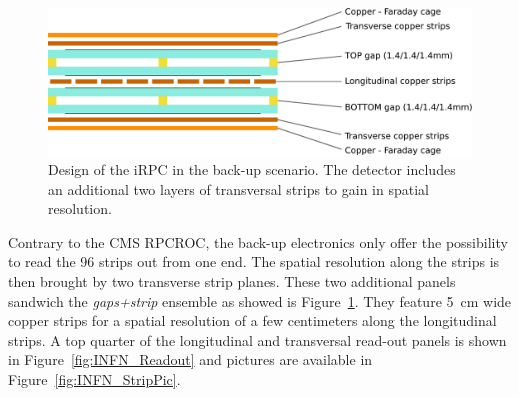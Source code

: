 	\begin{figure}[H]
		\centering
		\includegraphics[width = 0.8\linewidth]{fig/chapt6/iRPC-INFN-Design.pdf}
		\caption{\label{fig:INFN-Design} Design of the iRPC in the back-up scenario. The detector includes an additional two layers of transversal strips to gain in spatial resolution.}
    \end{figure}
	
	Contrary to the CMS RPCROC, the back-up electronics only offer the possibility to read the 96 strips out from one end. The spatial resolution along the strips is then brought by two transverse strip planes. These two additional panels sandwich the \textit{gaps+strip} ensemble as showed is Figure~\ref{fig:INFN-Design}. They feature \SI{5}{cm} wide copper strips for a spatial resolution of a few centimeters along the longitudinal strips. A top quarter of the longitudinal and transversal read-out panels is shown in Figure~\ref{fig:INFN_Readout} and pictures are available in Figure~\ref{fig:INFN_StripPic}.
	 
